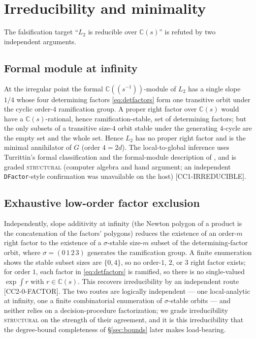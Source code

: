 \documentclass[11pt,reqno]{amsart}
\theoremstyle{plain}
\theoremstyle{definition}
\theoremstyle{remark}
\newcommand{\C}{\mathbb{C}}
\newcommand{\Ltwo}{L_{2}}
\newcommand{\claim}[1]{\textsf{\small[#1]}}
\begin{document}
\section{Irreducibility and minimality}\label{sec:irred}

The falsification target ``$\Ltwo$ is reducible over $\C(s)$'' is refuted by
two independent arguments.

\subsection{Formal module at infinity}
At the irregular point the formal $\C((s^{-1}))$-module of $\Ltwo$ has a single
slope $1/4$ whose four determining factors \eqref{eq:detfactors} form one
transitive orbit under the cyclic order-$4$ ramification group. A proper right
factor over $\C(s)$ would have a $\C(s)$-rational, hence ramification-stable,
set of determining factors; but the only subsets of a transitive size-$4$
orbit stable under the generating $4$-cycle are the empty set and the whole
set. Hence $\Ltwo$ has no proper right factor and is the minimal annihilator of
$G$ (order $4=2d$). The local-to-global inference uses Turrittin's formal
classification and the formal-module description of
\cite[Ch.~3]{vdPutSinger}, and is graded \textsc{structural} (computer algebra
and hand argument; an independent \texttt{DFactor}-style confirmation was
unavailable on the host) \claim{CC1-IRREDUCIBLE}.

\subsection{Exhaustive low-order factor exclusion}
Independently, slope additivity at infinity (the Newton polygon of a product is
the concatenation of the factors' polygons) reduces the existence of an
order-$m$ right factor to the existence of a $\sigma$-stable size-$m$ subset of
the determining-factor orbit, where $\sigma=(0\,1\,2\,3)$ generates the
ramification group. A finite enumeration shows the stable subset sizes are
$\{0,4\}$, so no order-$1$, $2$, or $3$ right factor exists; for order $1$,
each factor in \eqref{eq:detfactors} is ramified, so there is no single-valued
$\exp\!\int r$ with $r\in\C(s)$. This recovers irreducibility by an
independent route \claim{CC2-0-FACTOR}. The two routes are logically
independent --- one local-analytic at infinity, one a finite combinatorial
enumeration of $\sigma$-stable orbits --- and neither relies on a
decision-procedure factorization; we grade irreducibility \textsc{structural}
on the strength of their agreement, and it is this irreducibility that the
degree-bound completeness of \S\ref{sec:bounds} later makes load-bearing.
\end{document}
